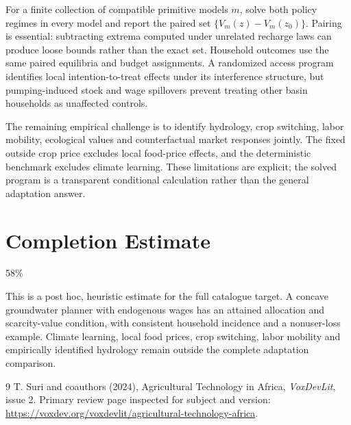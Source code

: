 \documentclass[11pt]{article}
\begin{document}
For a finite collection of compatible primitive models $m$, solve both policy regimes in every model and report the paired set $\{V_m(z)-V_m(z_0)\}$. Pairing is essential: subtracting extrema computed under unrelated recharge laws can produce loose bounds rather than the exact set. Household outcomes use the same paired equilibria and budget assignments. A randomized access program identifies local intention-to-treat effects under its interference structure, but pumping-induced stock and wage spillovers prevent treating other basin households as unaffected controls.

The remaining empirical challenge is to identify hydrology, crop switching, labor mobility, ecological values and counterfactual market responses jointly. The fixed outside crop price excludes local food-price effects, and the deterministic benchmark excludes climate learning. These limitations are explicit; the solved program is a transparent conditional calculation rather than the general adaptation answer.

\section{Completion Estimate}
58\%

This is a post hoc, heuristic estimate for the full catalogue target.
A concave groundwater planner with endogenous wages has an attained allocation and scarcity-value condition, with consistent household incidence and a nonuser-loss example. Climate learning, local food prices, crop switching, labor mobility and empirically identified hydrology remain outside the complete adaptation comparison.

\begin{thebibliography}{9}
 T. Suri and coauthors (2024), Agricultural Technology in Africa, \emph{VoxDevLit}, issue 2. Primary review page inspected for subject and version: \url{https://voxdev.org/voxdevlit/agricultural-technology-africa}.
\end{thebibliography}
\end{document}
